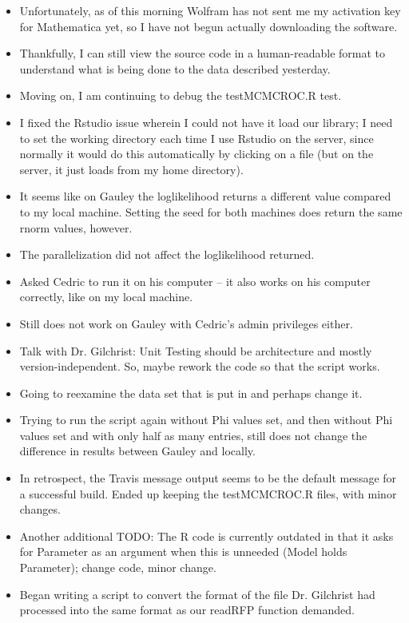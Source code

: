 \documentclass[12pt,hyperref]{labbook}
\begin{document}
\begin{itemize}
    \item Unfortunately, as of this morning Wolfram has not sent me my activation key for Mathematica yet, so I have not begun actually downloading the software.
    \item Thankfully, I can still view the source code in a human-readable format to understand what is being done to the data described yesterday.
    \item Moving on, I am continuing to debug the testMCMCROC.R test.
    \item I fixed the Rstudio issue wherein I could not have it load our library; I need to set the working directory each time I use Rstudio on the server, since normally it would do this automatically by clicking on a file (but on the server, it just loads from my home directory).
    \item It seems like on Gauley the loglikelihood returns a different value compared to my local machine. Setting the seed for both machines does return the same rnorm values, however.
    \item The parallelization did not affect the loglikelihood returned.
    \item Asked Cedric to run it on his computer -- it also works on his computer correctly, like on my local machine.
    \item Still does not work on Gauley with Cedric's admin privileges either.
    \item Talk with Dr. Gilchrist: Unit Testing should be architecture and mostly version-independent. 
    So, maybe rework the code so that the script works.
    \item Going to reexamine the data set that is put in and perhaps change it.
    \item Trying to run the script again without Phi values set, and then without Phi values set and with only half as many entries, still does not change the difference in results between Gauley and locally.
    \item In retrospect, the Travis message output seems to be the default message for a successful build. Ended up keeping the testMCMCROC.R files, with minor changes.
    \item Another additional TODO: The R code is currently outdated in that it asks for Parameter as an argument when this is unneeded (Model holds Parameter); change code, minor change.
    \item Began writing a script to convert the format of the file Dr. Gilchrist had processed into the same format as our readRFP function demanded.
\end{itemize}
\end{document}
